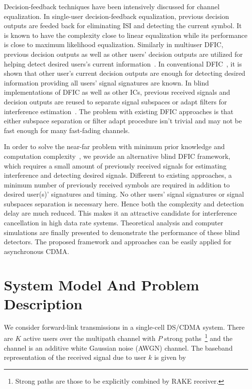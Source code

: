 \documentclass[a4paper,10pt,fleqn, twocolumn]{IEEETran}
\begin{document}
Decision-feedback techniques have been intensively discussed for
channel equalization. In single-user decision-feedback
equalization, previous decision outputs are feeded back for
eliminating ISI and detecting the current symbol. It is known to
have the complexity close to linear equalization while its
performance is close to maximum likelihood equalization. Similarly
in multiuser DFIC, previous decision outputs as well as other
users' decision outputs are utilized for helping detect desired
users's current information~\cite{Verd98,Madh98}. In conventional
DFIC~\cite{Verd98}, it is shown that other user's current decision
outputs are enough for detecting desired information providing all
users' signal signatures are known. In blind implementations of
DFIC as well as other ICs, previous received signals and decision
outputs are reused to separate signal subspaces or adapt filters
for interference estimation~\cite{Madh98,Wang98}. The problem with
existing DFIC approaches is that either subspace separation or
filter adapt procedure isn't trivial and may not be fast enough
for many fast-fading channels.

In order to solve the near-far problem with minimum prior
knowledge and computation complexity~\cite{Wang03d,Wang05A}, we
provide an alternative blind DFIC framework, which requires a
small amount of previously received signals for estimating
interference and detecting desired signals. Different to existing
approaches, a minimum number of previously received symbols are
required in addition to desired user(s)' signatures and timing. No
other users' signal signatures or signal subspaces separation is
necessary here. Hence both the complexity and detection delay are
much reduced. This makes it an attractive candidate for
interference cancellation in high data rate systems. Theoretical
analysis and computer simulations are finally presented to
demonstrate the performance of these blind detectors. The proposed
framework and approaches can be easily applied for asynchronous
CDMA.
\section{System Model And Problem Description}
We consider forward-link transmissions in a single-cell DS/CDMA
system. There are $K$ active users over the multipath channel with
$P$ strong paths~\footnote{Strong paths are those to be explicitly
combined by RAKE receiver.} and the channel is an additive white
Gaussian noise (AWGN) channel. The baseband representation of the
received signal due to user $k$ is given by
\end{document}
